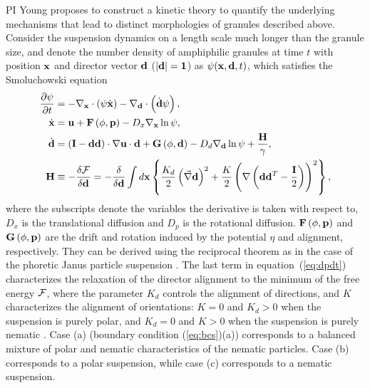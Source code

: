 PI Young proposes to construct a kinetic theory to quantify the underlying mechanisms that lead to distinct morphologies of granules described above.
Consider the suspension dynamics on a length scale much longer than the granule size, and denote the number density of 
amphiphilic granules at time $t$ with position ${\bf x}$ and director vector ${\bf d}$ ($|\bf d|=1$) as $\psi({\bf x}, {\bf d},t)$, which satisfies the 
Smoluchowski equation 
\begin{align}
\frac{\partial \psi}{\partial t} &= -\nabla_{\bf x} \cdot\left(\psi\dot{\bf x}\right) - \nabla_{\bf d}\cdot\left(\dot{\bf d}\psi\right),\\
\dot{\bf x} &= {\bf u} + {\bf F}\left(\phi,{\bf p}\right) - D_x\nabla_{\bf x}\ln\psi,\\
\label{eq:dpdt}
\dot{\bf d} &= \left({\bf I}-{\bf d}{\bf d}\right)\cdot\nabla {\bf u}\cdot {\bf d} + {\bf G}\left(\phi,{\bf d}\right) - D_d \nabla_{\bf d}\ln \psi + \frac{{\bf H}}{\gamma},\\
{\bf H} &\equiv -\frac{\delta {\cal F}}{\delta {\bf d}} = -\frac{\delta}{\delta {\bf d}} 
\int d{\bf x} \left\{\frac{K_d}{2} \left(\vec\nabla{\bf d}\right)^2 + \frac{K}{2}\left(\nabla\left({\bf d}{\bf d}^T- \frac{\bf I}{2}\right)\right)^2\right\},
\end{align}
where the subscripts denote the variables the derivative is taken with respect to, 
$D_x$ is the translational diffusion and $D_p$ is the rotational diffusion. 
 ${\bf F}\left(\phi,{\bf p}\right)$ and ${\bf G}\left(\phi,{\bf p}\right)$ are the drift and rotation induced by the potential $\eta$ and alignment, respectively.
 They can be derived using the reciprocal theorem as in the case of 
the phoretic Janus particle suspension \cite{TraversoMichellin2020_PRF,TraversoMichellin2022_JFM}.
The last term in equation~(\ref{eq:dpdt}) characterizes the relaxation of the director alignment to the minimum of the
free energy ${\cal F}$, where the parameter $K_d$ controls the alignment of directions, and $K$ characterizes the alignment of orientations:
$K=0$ and $K_d > 0$ when the suspension is purely polar, and $K_d=0$  and $K>0$ when the suspension is purely nematic \cite{Amiri2022_JPhysA}. 
%
Case (a) (boundary condition (\ref{eq:bcs})(a)) corresponds to a balanced mixture of polar and nematic characteristics of the nematic particles.
Case (b) corresponds to a polar suspension, while case (c) corresponds to a nematic suspension. 

